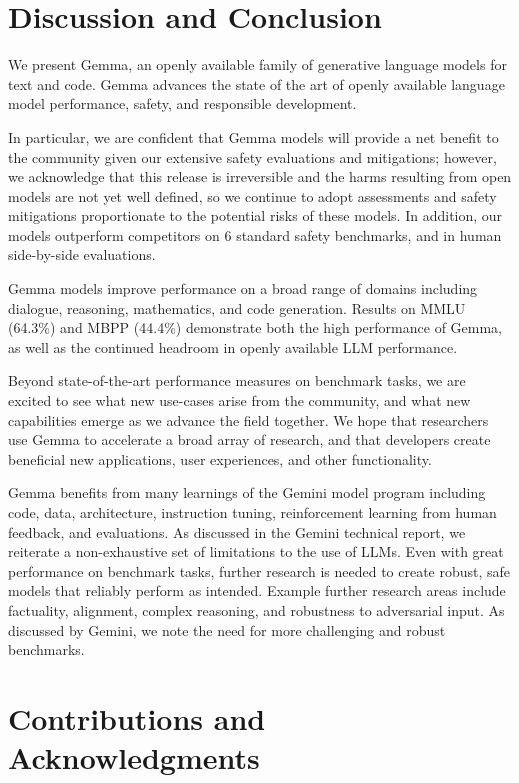 \documentclass[11pt, a4paper, logo, twocolumn, copyright, nonumbering]{googledeepmind}
\begin{document}
\section{Discussion and Conclusion}

We present Gemma, an openly available family of generative language models for text and code. Gemma advances the state of the art of openly available language model performance, safety, and responsible development.

In particular, we are confident that Gemma models will provide a net benefit to the community given our extensive safety evaluations and mitigations; however, we acknowledge that this release is irreversible and the harms resulting from open models are not yet well defined, so we continue to adopt assessments and safety mitigations proportionate to the potential risks of these models. In addition, our models outperform competitors on 6 standard safety benchmarks, and in human side-by-side evaluations.

Gemma models improve performance on a broad range of domains including dialogue, reasoning, mathematics, and code generation. Results on MMLU (64.3\%) and MBPP (44.4\%) demonstrate both the high performance of Gemma, as well as the continued headroom in openly available LLM performance.

Beyond state-of-the-art performance measures on benchmark tasks, we are excited to see what new use-cases arise from the community, and what new capabilities emerge as we advance the field together. We hope that researchers use Gemma to accelerate a broad array of research, and that developers create beneficial new applications, user experiences, and other functionality.

Gemma benefits from many learnings of the Gemini model program including code, data, architecture, instruction tuning, reinforcement learning from human feedback, and evaluations. As discussed in the Gemini technical report, we reiterate a non-exhaustive set of limitations to the use of LLMs. Even with great performance on benchmark tasks, further research is needed to create robust, safe models that reliably perform as intended. Example further research areas include factuality, alignment, complex reasoning, and robustness to adversarial input. As discussed by Gemini, we note the need for more challenging and robust benchmarks.

\clearpage

\section{Contributions and Acknowledgments}
\end{document}
